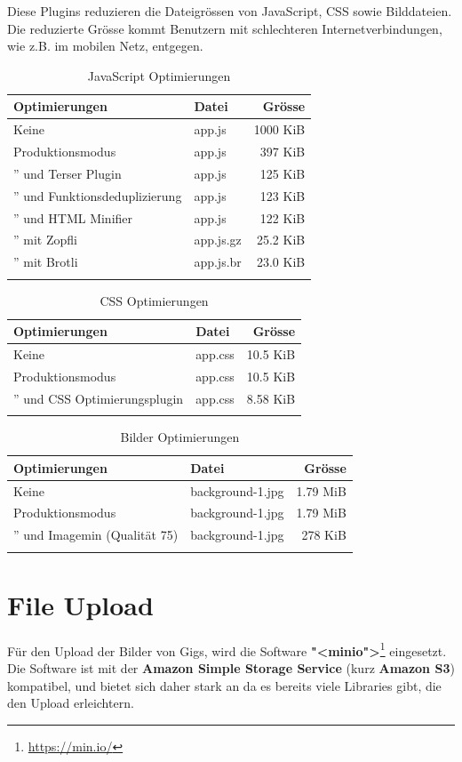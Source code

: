 Diese Plugins reduzieren die Dateigrössen von JavaScript, CSS sowie Bilddateien.
Die reduzierte Grösse kommt Benutzern mit schlechteren Internetverbindungen, wie z.B. im mobilen Netz, entgegen.

\begin{longtable}[]{@{}llr@{}}
  \toprule
  \textbf{Optimierungen}        & \textbf{Datei} & \textbf{Grösse}\tabularnewline
  \midrule
  Keine                         & app.js         & 1000 KiB\tabularnewline
  Produktionsmodus              & app.js         & 397 KiB\tabularnewline
  ” und Terser Plugin           & app.js         & 125 KiB\tabularnewline
  ” und Funktionsdeduplizierung & app.js         & 123 KiB\tabularnewline
  ” und HTML Minifier           & app.js         & 122 KiB\tabularnewline
  ” mit Zopfli                  & app.js.gz      & 25.2 KiB\tabularnewline
  ” mit Brotli                  & app.js.br      & 23.0 KiB\tabularnewline
  \bottomrule
  \caption{JavaScript Optimierungen}
\end{longtable}

\begin{longtable}[]{@{}llr@{}}
  \toprule
  \textbf{Optimierungen}       & \textbf{Datei} & \textbf{Grösse}\tabularnewline
  \midrule
  Keine                        & app.css        & 10.5 KiB\tabularnewline
  Produktionsmodus             & app.css        & 10.5 KiB\tabularnewline
  ” und CSS Optimierungsplugin & app.css        & 8.58 KiB\tabularnewline
  \bottomrule
  \caption{CSS Optimierungen}
\end{longtable}

\begin{longtable}[]{@{}llr@{}}
  \toprule
  \textbf{Optimierungen}       & \textbf{Datei}   & \textbf{Grösse}\tabularnewline
  \midrule
  Keine                        & background-1.jpg & 1.79 MiB\tabularnewline
  Produktionsmodus             & background-1.jpg & 1.79 MiB\tabularnewline
  ” und Imagemin (Qualität 75) & background-1.jpg & 278 KiB\tabularnewline
  \bottomrule
  \caption{Bilder Optimierungen}
\end{longtable}

\clearpage
\section{File Upload}

Für den Upload der Bilder von Gigs, wird die Software \textbf{"<minio">}\footnote{\url{https://min.io/}} eingesetzt.
Die Software ist mit der \textbf{Amazon Simple Storage Service} (kurz \textbf{Amazon S3}) kompatibel, und bietet sich daher
stark an da es bereits viele Libraries gibt, die den Upload erleichtern.

